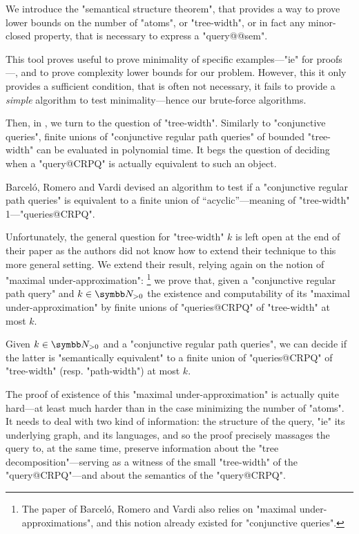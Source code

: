 \begin{contribution}
	We introduce the "semantical structure theorem", that provides
	a way to prove lower bounds on the number
	of "atoms", or "tree-width", or in fact any minor-closed property,
	that is necessary to express a "query@@sem".
\end{contribution}

This tool proves useful to prove minimality of specific examples---"ie"
for proofs---, and to prove complexity lower bounds for our problem.
However, this it only provides a sufficient condition, that is often not
necessary, it fails to provide a \emph{simple} algorithm to test minimality---hence our
brute-force algorithms.

Then, in , we turn to the question
of "tree-width". Similarly to "conjunctive queries", finite unions of
"conjunctive regular path queries"
of bounded "tree-width" can be evaluated in polynomial time.
It begs the question of deciding when a "query@CRPQ" is actually equivalent
to such an object.

\begin{known}
	Barceló, Romero and Vardi \cite{BarceloRomeroVardi2016SemanticAcyclicity}
	devised an algorithm to test
	if a "conjunctive regular path queries" is equivalent to
	a finite union of ``acyclic''---meaning of "tree-width" 1---"queries@CRPQ".
\end{known}

Unfortunately, the general question for "tree-width" $k$ is left open at the end
of their paper as the authors did not know how to extend their technique to this
more general setting. We extend their result, relying again on the notion
of "maximal under-approximation":%
\footnote{The paper of Barceló, Romero and Vardi
also relies on "maximal under-approximations", and this notion already existed
for "conjunctive queries".}
we prove that, given a "conjunctive regular path query" and
$k\in\Np$ the existence and computability of its "maximal under-approximation"
by finite unions of "queries@CRPQ" of "tree-width" at most $k$.

\begin{contribution}
	Given $k\in \Np$ and a "conjunctive regular path queries",
	we can decide if the latter is "semantically equivalent"
	to a finite union of "queries@CRPQ" of "tree-width"
	(resp. "path-width") at most $k$.
\end{contribution}

The proof of existence of this "maximal under-approximation" is
actually quite hard---at least much harder than in the case minimizing
the number of "atoms". It needs to deal with two kind of information:
the structure of the query, "ie" its underlying graph, and its languages,
and so the proof precisely massages the query to, at the same time,
preserve information about the "tree decomposition"---serving as a
witness of the small "tree-width" of the "query@CRPQ"---and about the
semantics of the "query@CRPQ".

